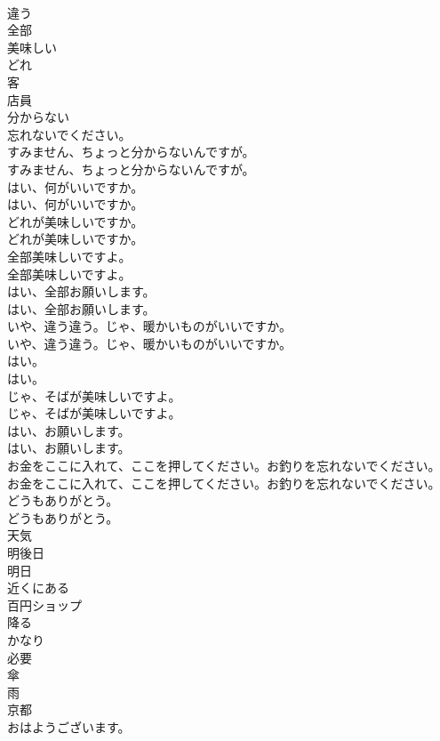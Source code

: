 \documentclass[8pt]{extreport}
\begin{document}
\begin{CJK}{UTF8}{min}
\\	違う
\\	全部
\\	美味しい
\\	どれ
\\	客
\\	店員
\\	分からない
\\	忘れないでください。
\\	すみません、ちょっと分からないんですが。	
\\	すみません、ちょっと分からないんですが。 
\\	はい、何がいいですか。	
\\	はい、何がいいですか。 
\\	どれが美味しいですか。	
\\	どれが美味しいですか。 
\\	全部美味しいですよ。	
\\	全部美味しいですよ。 
\\	はい、全部お願いします。	
\\	はい、全部お願いします。 
\\	いや、違う違う。じゃ、暖かいものがいいですか。	
\\	いや、違う違う。じゃ、暖かいものがいいですか。 
\\	はい。	
\\	はい。 
\\	じゃ、そばが美味しいですよ。	
\\	じゃ、そばが美味しいですよ。 
\\	はい、お願いします。	
\\	はい、お願いします。 
\\	お金をここに入れて、ここを押してください。お釣りを忘れないでください。	
\\	お金をここに入れて、ここを押してください。お釣りを忘れないでください。 
\\	どうもありがとう。	
\\	どうもありがとう。 
\\	天気
\\	明後日
\\	明日
\\	近くにある
\\	百円ショップ
\\	降る
\\	かなり
\\	必要
\\	傘
\\	雨
\\	京都
\\	おはようございます。	

\end{CJK}
\end{document}
